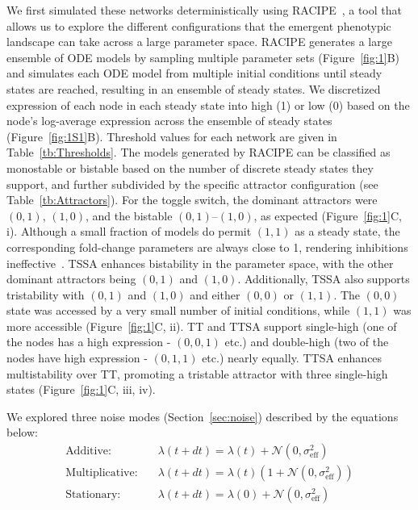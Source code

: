 \documentclass[11pt]{article}
\begin{document}
We first simulated these networks deterministically using RACIPE~\cite{Huang2017}, a tool that allows us to explore the different configurations that the emergent phenotypic landscape can take across a large parameter space. RACIPE generates a large ensemble of ODE models by sampling multiple parameter sets (Figure~\ref{fig:1}B) and simulates each ODE model from multiple initial conditions until steady states are reached, resulting in an ensemble of steady states. We discretized expression of each node in each steady state into high (1) or low (0) based on the node's log-average expression across the ensemble of steady states (Figure~\ref{fig:1S1}B).  Threshold values for each network are given in Table~\ref{tb:Thresholds}. The models generated by RACIPE can be classified as monostable or bistable based on the number of discrete steady states they support, and further subdivided by the specific attractor configuration (see Table~\ref{tb:Attractors}). For the toggle switch, the dominant attractors were $(0,1)$, $(1,0)$, and the bistable $(0,1)\text{--}(1,0)$, as expected (Figure~\ref{fig:1}C, i). Although a small fraction of models do permit $(1,1)$ as a steady state, the corresponding fold-change parameters are always close to 1, rendering inhibitions ineffective~\cite{hari_assessing_2023}. TSSA enhances bistability in the parameter space, with the other dominant attractors being $(0,1)$ and $(1,0)$. Additionally, TSSA also supports tristability with $(0,1)$ and $(1,0)$ and either $(0, 0)$ or $(1, 1)$. The $(0, 0)$ state was accessed by a very small number of initial conditions, while $(1, 1)$ was more accessible (Figure~\ref{fig:1}C, ii). TT and TTSA support single-high (one of the nodes has a high expression - $(0, 0, 1)$ etc.) and double-high (two of the nodes have high expression - $(0, 1, 1)$ etc.) nearly equally. TTSA enhances multistability over TT, promoting a tristable attractor with three single-high states (Figure~\ref{fig:1}C, iii, iv).

We explored three noise modes (Section~\ref{sec:noise}) described by the equations below: 
\begin{equation}
\begin{aligned}
\text{Additive:} \quad & \lambda(t+dt) = \lambda(t) + \mathcal{N}(0, \sigma_{\text{eff}}^2) \\
\text{Multiplicative:} \quad & \lambda(t+dt) = \lambda(t)\left(1 + \mathcal{N}(0, \sigma_{\text{eff}}^2)\right) \\
\text{Stationary:} \quad & \lambda(t+dt) = \lambda(0) + \mathcal{N}(0, \sigma_{\text{eff}}^2)
\label{eq:lambda}
\end{aligned}
\end{equation}
\end{document}
